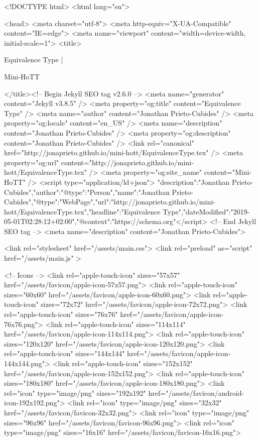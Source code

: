 <!DOCTYPE html>
<html lang="en">

<head>
  <meta charset="utf-8">
  <meta http-equiv="X-UA-Compatible" content="IE=edge">
  <meta name="viewport" content="width=device-width, initial-scale=1">
  <title>
    
      
        Equivalence Type |
      
        Mini-HoTT
    
  </title><!-- Begin Jekyll SEO tag v2.6.0 -->
<meta name="generator" content="Jekyll v3.8.5" />
<meta property="og:title" content="Equivalence Type" />
<meta name="author" content="Jonathan Prieto-Cubides" />
<meta property="og:locale" content="en_US" />
<meta name="description" content="Jonathan Prieto-Cubides" />
<meta property="og:description" content="Jonathan Prieto-Cubides" />
<link rel="canonical" href="http://jonaprieto.github.io/mini-hott/EquivalenceType.tex" />
<meta property="og:url" content="http://jonaprieto.github.io/mini-hott/EquivalenceType.tex" />
<meta property="og:site_name" content="Mini-HoTT" />
<script type="application/ld+json">
{"description":"Jonathan Prieto-Cubides","author":{"@type":"Person","name":"Jonathan Prieto-Cubides"},"@type":"WebPage","url":"http://jonaprieto.github.io/mini-hott/EquivalenceType.tex","headline":"Equivalence Type","dateModified":"2019-05-01T02:28:12+02:00","@context":"https://schema.org"}</script>
<!-- End Jekyll SEO tag -->
<meta name="description" content="Jonathan Prieto-Cubides">

  <link rel="stylesheet" href="/assets/main.css">
  <link rel="preload" as="script" href="/assets/main.js" >

  <!-- Icons -->
  <link rel="apple-touch-icon" sizes="57x57" href="/assets/favicon/apple-icon-57x57.png">
  <link rel="apple-touch-icon" sizes="60x60" href="/assets/favicon/apple-icon-60x60.png">
  <link rel="apple-touch-icon" sizes="72x72" href="/assets/favicon/apple-icon-72x72.png">
  <link rel="apple-touch-icon" sizes="76x76" href="/assets/favicon/apple-icon-76x76.png">
  <link rel="apple-touch-icon" sizes="114x114" href="/assets/favicon/apple-icon-114x114.png">
  <link rel="apple-touch-icon" sizes="120x120" href="/assets/favicon/apple-icon-120x120.png">
  <link rel="apple-touch-icon" sizes="144x144" href="/assets/favicon/apple-icon-144x144.png">
  <link rel="apple-touch-icon" sizes="152x152" href="/assets/favicon/apple-icon-152x152.png">
  <link rel="apple-touch-icon" sizes="180x180" href="/assets/favicon/apple-icon-180x180.png">
  <link rel="icon" type="image/png" sizes="192x192"  href="/assets/favicon/android-icon-192x192.png">
  <link rel="icon" type="image/png" sizes="32x32" href="/assets/favicon/favicon-32x32.png">
  <link rel="icon" type="image/png" sizes="96x96" href="/assets/favicon/favicon-96x96.png">
  <link rel="icon" type="image/png" sizes="16x16" href="/assets/favicon/favicon-16x16.png">

